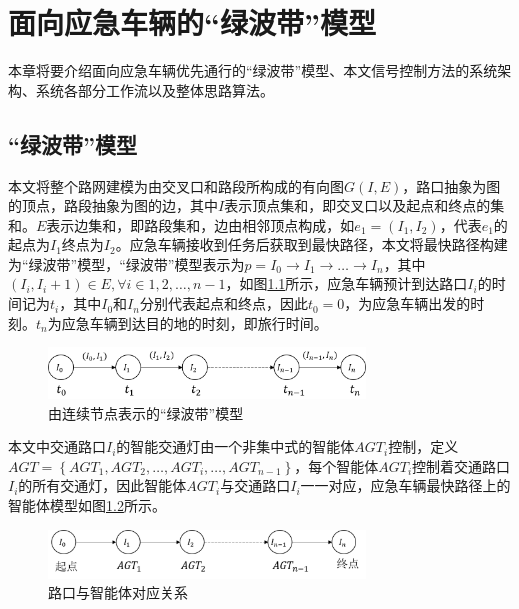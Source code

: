 \chapter{面向应急车辆的“绿波带”模型}
\label{ch3}

本章将要介绍面向应急车辆优先通行的“绿波带”模型、本文信号控制方法的系统架构、系统各部分工作流以及整体思路算法。

\section{“绿波带”模型}
本文将整个路网建模为由交叉口和路段所构成的有向图${G(I, E)}$，路口抽象为图的顶点，路段抽象为图的边，其中${I}$表示顶点集和，即交叉口以及起点和终点的集和。${E}$表示边集和，即路段集和，边由相邻顶点构成，如${e_1=(I_1, I_2)}$，代表${e_1}$的起点为${I_1}$终点为${I_2}$。应急车辆接收到任务后获取到最快路径，本文将最快路径构建为“绿波带”模型，“绿波带”模型表示为${p=I_0\rightarrow I_1\rightarrow\ldots\rightarrow I_n}$，其中${(I_i, I_i+1) \in E, \forall i \in 1, 2, \ldots, n-1}$，如图\ref{fig:path}所示，应急车辆预计到达路口${I_i}$的时间记为${t_i}$，其中${I_0}$和${I_n}$分别代表起点和终点，因此${t_0=0}$，为应急车辆出发的时刻。${t_n}$为应急车辆到达目的地的时刻，即旅行时间。


\begin{figure}[H]
	\centering
	\includegraphics[width=0.75\textwidth]{figures/path.png}
	\caption{由连续节点表示的“绿波带”模型}
	\label{fig:path}
\end{figure}

本文中交通路口${I_i}$的智能交通灯由一个非集中式的智能体${AGT_i}$控制，定义${AGT=\left\{ {AGT_1, AGT_2, \ldots , AGT_i, \ldots, AGT_{n-1}} \right\}}$，每个智能体${AGT_i}$控制着交通路口${I_i}$的所有交通灯，因此智能体${AGT_i}$与交通路口${I_i}$一一对应，应急车辆最快路径上的智能体模型如图\ref{fig:agent}所示。

\begin{figure}[H]
	\centering
	\includegraphics[width=0.75\textwidth]{figures/agent.png}
	\caption{路口与智能体对应关系}
	\label{fig:agent}
\end{figure}

